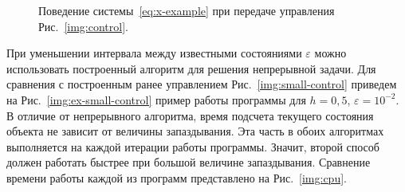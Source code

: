 \begin{figure}[bh]
        \noindent{}
        \caption{Поведение системы~\eqref{eq:x-example} при передаче управления Рис.~\ref{img:control}.}
        \label{img:ex-discr-coords}
\end{figure}

При уменьшении интервала между известными состояниями $\varepsilon$ можно использовать построенный алгоритм для решения непрерывной задачи. Для сравнения с построенным ранее управлением Рис.~\ref{img:small-control} приведем на Рис.~\ref{img:ex-small-control} пример работы программы для $h = 0,\!5$, $\varepsilon = 10^{-2}$. В отличие от непрерывного алгоритма, время подсчета текущего состояния объекта не зависит от величины запаздывания. Эта часть в обоих алгоритмах выполняется на каждой итерации работы программы. Значит, второй способ должен работать быстрее при большой величине запаздывания. Сравнение времени работы каждой из программ представлено на Рис.~\ref{img:cpu}.

